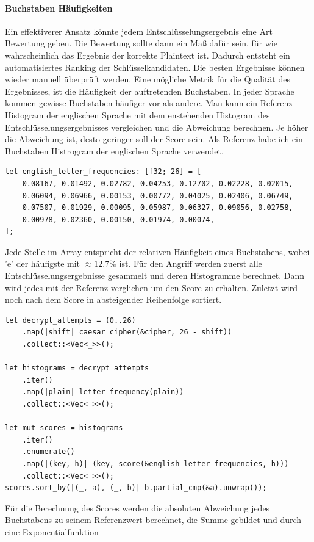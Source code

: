 \documentclass{article}
\begin{document}
    \paragraph{Buchstaben Häufigkeiten} Ein effektiverer Ansatz könnte jedem Entschlüsselungsergebnis
    eine Art Bewertung geben. Die Bewertung sollte dann ein Maß dafür sein, für wie wahrscheinlich das Ergebnis
    der korrekte Plaintext ist. Dadurch entsteht ein automatisiertes Ranking der Schlüsselkandidaten.
    Die besten Ergebnisse können wieder manuell überprüft werden. Eine mögliche Metrik für
    die Qualität des Ergebnisses, ist die Häufigkeit der auftretenden Buchstaben. In jeder Sprache
    kommen gewisse Buchstaben häufiger vor als andere. Man kann ein Referenz Histogram der
    englischen Sprache mit dem enstehenden Histogram des Entschlüsselungsergebnisses vergleichen
    und die Abweichung berechnen. Je höher die Abweichung ist, desto geringer soll der 
    Score sein. Als Referenz habe ich ein Buchstaben Histrogram der englischen Sprache verwendet.
    \begin{verbatim}
let english_letter_frequencies: [f32; 26] = [
    0.08167, 0.01492, 0.02782, 0.04253, 0.12702, 0.02228, 0.02015, 
    0.06094, 0.06966, 0.00153, 0.00772, 0.04025, 0.02406, 0.06749, 
    0.07507, 0.01929, 0.00095, 0.05987, 0.06327, 0.09056, 0.02758, 
    0.00978, 0.02360, 0.00150, 0.01974, 0.00074,
];
    \end{verbatim}
    Jede Stelle im Array entspricht der relativen Häufigkeit eines Buchstabens, wobei
    'e' der häufigste mit $\approx 12.7\%$ ist.
    Für den Angriff werden zuerst alle Entschlüsselungsergebnisse gesammelt und deren Histogramme berechnet.
    Dann wird jedes mit der Referenz verglichen um den Score zu erhalten. Zuletzt
    wird noch nach dem Score in absteigender Reihenfolge sortiert.\newpage
    \begin{verbatim}
let decrypt_attempts = (0..26)
    .map(|shift| caesar_cipher(&cipher, 26 - shift))
    .collect::<Vec<_>>();

let histograms = decrypt_attempts
    .iter()
    .map(|plain| letter_frequency(plain))
    .collect::<Vec<_>>();

let mut scores = histograms
    .iter()
    .enumerate()
    .map(|(key, h)| (key, score(&english_letter_frequencies, h)))
    .collect::<Vec<_>>();
scores.sort_by(|(_, a), (_, b)| b.partial_cmp(&a).unwrap());
    \end{verbatim}
    Für die Berechnung des Scores werden die absoluten Abweichung jedes Buchstabens zu seinem
    Referenzwert berechnet, die Summe gebildet und durch eine Exponentialfunktion
\end{document}
